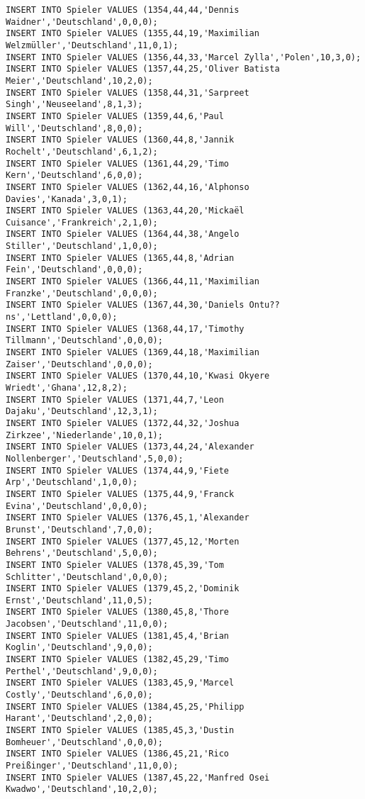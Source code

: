 \documentclass{lehramt-informatik-aufgabe}
\begin{document}
\begin{verbatim}
INSERT INTO Spieler VALUES (1354,44,44,'Dennis Waidner','Deutschland',0,0,0);
INSERT INTO Spieler VALUES (1355,44,19,'Maximilian Welzmüller','Deutschland',11,0,1);
INSERT INTO Spieler VALUES (1356,44,33,'Marcel Zylla','Polen',10,3,0);
INSERT INTO Spieler VALUES (1357,44,25,'Oliver Batista Meier','Deutschland',10,2,0);
INSERT INTO Spieler VALUES (1358,44,31,'Sarpreet Singh','Neuseeland',8,1,3);
INSERT INTO Spieler VALUES (1359,44,6,'Paul Will','Deutschland',8,0,0);
INSERT INTO Spieler VALUES (1360,44,8,'Jannik Rochelt','Deutschland',6,1,2);
INSERT INTO Spieler VALUES (1361,44,29,'Timo Kern','Deutschland',6,0,0);
INSERT INTO Spieler VALUES (1362,44,16,'Alphonso Davies','Kanada',3,0,1);
INSERT INTO Spieler VALUES (1363,44,20,'Mickaël Cuisance','Frankreich',2,1,0);
INSERT INTO Spieler VALUES (1364,44,38,'Angelo Stiller','Deutschland',1,0,0);
INSERT INTO Spieler VALUES (1365,44,8,'Adrian Fein','Deutschland',0,0,0);
INSERT INTO Spieler VALUES (1366,44,11,'Maximilian Franzke','Deutschland',0,0,0);
INSERT INTO Spieler VALUES (1367,44,30,'Daniels Ontu??ns','Lettland',0,0,0);
INSERT INTO Spieler VALUES (1368,44,17,'Timothy Tillmann','Deutschland',0,0,0);
INSERT INTO Spieler VALUES (1369,44,18,'Maximilian Zaiser','Deutschland',0,0,0);
INSERT INTO Spieler VALUES (1370,44,10,'Kwasi Okyere Wriedt','Ghana',12,8,2);
INSERT INTO Spieler VALUES (1371,44,7,'Leon Dajaku','Deutschland',12,3,1);
INSERT INTO Spieler VALUES (1372,44,32,'Joshua Zirkzee','Niederlande',10,0,1);
INSERT INTO Spieler VALUES (1373,44,24,'Alexander Nollenberger','Deutschland',5,0,0);
INSERT INTO Spieler VALUES (1374,44,9,'Fiete Arp','Deutschland',1,0,0);
INSERT INTO Spieler VALUES (1375,44,9,'Franck Evina','Deutschland',0,0,0);
INSERT INTO Spieler VALUES (1376,45,1,'Alexander Brunst','Deutschland',7,0,0);
INSERT INTO Spieler VALUES (1377,45,12,'Morten Behrens','Deutschland',5,0,0);
INSERT INTO Spieler VALUES (1378,45,39,'Tom Schlitter','Deutschland',0,0,0);
INSERT INTO Spieler VALUES (1379,45,2,'Dominik Ernst','Deutschland',11,0,5);
INSERT INTO Spieler VALUES (1380,45,8,'Thore Jacobsen','Deutschland',11,0,0);
INSERT INTO Spieler VALUES (1381,45,4,'Brian Koglin','Deutschland',9,0,0);
INSERT INTO Spieler VALUES (1382,45,29,'Timo Perthel','Deutschland',9,0,0);
INSERT INTO Spieler VALUES (1383,45,9,'Marcel Costly','Deutschland',6,0,0);
INSERT INTO Spieler VALUES (1384,45,25,'Philipp Harant','Deutschland',2,0,0);
INSERT INTO Spieler VALUES (1385,45,3,'Dustin Bomheuer','Deutschland',0,0,0);
INSERT INTO Spieler VALUES (1386,45,21,'Rico Preißinger','Deutschland',11,0,0);
INSERT INTO Spieler VALUES (1387,45,22,'Manfred Osei Kwadwo','Deutschland',10,2,0);

\end{verbatim}
\end{document}
